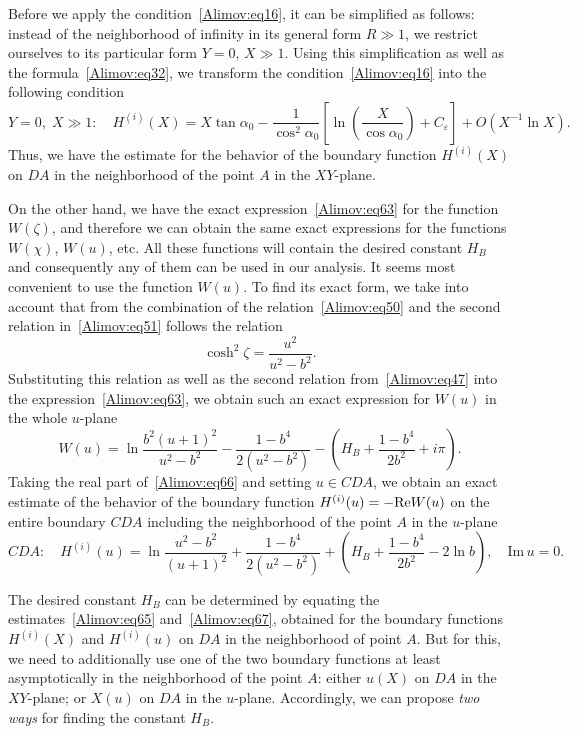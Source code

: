 \documentclass[
11pt,%
tightenlines,%
twoside,%
onecolumn,%
nofloats,%
nobibnotes,%
nofootinbib,%
superscriptaddress,%
noshowpacs,%
centertags]%
{revtex4-2}
\begin{document}
Before we apply the condition~\eqref{Alimov:eq16}, it can be simplified as follows: instead of the
neighborhood of infinity in its general form $R \gg 1$, we restrict ourselves to its particular
form $Y = 0$, $X \gg 1$. Using this simplification as well as the formula~\eqref{Alimov:eq32}, we
transform the condition~\eqref{Alimov:eq16} into the following condition
\begin{equation}
\label{Alimov:eq65} Y = 0, \; X \gg 1: \quad  H^{(i)}(X) = X \tan \alpha_0 -
\frac{1}{\cos^2\alpha_0 }\left[ {\ln \left( {\frac{X}{\cos \alpha_0 }} \right) + C_\varepsilon}
\right] + O\left( {X^{-1}\ln X} \right).
\end{equation}
Thus, we have the estimate for the behavior of the boundary function $H^{(i)}(X)$ on $DA$ in the
neighborhood of the point $A$ in the $XY$-plane.

On the other hand, we have the exact expression~\eqref{Alimov:eq63} for the function $W(\zeta)$,
and therefore we can obtain the same exact expressions for the functions $W(\chi)$, $W(u)$, etc.
All these functions will contain the desired constant $H_B$ and consequently any of them can be
used in our analysis. It seems most convenient to use the function $W(u)$. To find its exact form,
we take into account that from the combination of the relation~\eqref{Alimov:eq50} and the second
relation in~\eqref{Alimov:eq51} follows the relation
\[
\cosh^2\zeta = \frac{u^2}{u^2- b^2}.
\]
Substituting this relation as well as the second relation from~\eqref{Alimov:eq47} into the
expression~\eqref{Alimov:eq63}, we obtain such an exact expression for $W(u)$ in the whole
$u$-plane
\begin{equation}
\label{Alimov:eq66} W(u) = \ln \frac{b^2(u + 1)^2}{u^2 - b^2} - \frac{1 - b^4}{2(u^2 - b^2)} -
\left( {H_B + \frac{1 - b^4}{2b^2} + i\pi } \right).
\end{equation}
Taking the real part of~\eqref{Alimov:eq66} and setting $u \in CDA$, we obtain an exact estimate of
the behavior of the boundary function $H^{(i)}(u) = - {\rm Re} W(u)$ on the entire boundary $CDA$
including the neighborhood of the point $A$ in the $u$-plane
\begin{equation}
\label{Alimov:eq67} CDA: \quad H^{(i)}(u) = \ln \frac{u^2 - b^2}{(u + 1)^2} + \frac{1 - b^4}{2(u^2
- b^2)} + \left( {H_B + \frac{1 - b^4}{2b^2} - 2\ln b} \right),\quad \mbox{Im}\, u = 0.
\end{equation}

The desired constant $H_B $ can be determined by equating the estimates~\eqref{Alimov:eq65}
and~\eqref{Alimov:eq67}, obtained for the boundary functions $H^{(i)}(X)$ and $H^{(i)}(u)$ on $DA$
in the neighborhood of point $A$. But for this, we need to additionally use one of the two boundary
functions at least asymptotically in the neighborhood of the point $A$: either $u(X)$ on $DA$ in
the $XY$-plane; or $X(u)$ on $DA$ in the $u$-plane. Accordingly, we can propose \textit{two ways}
for finding the constant $H_B$.
\end{document}
